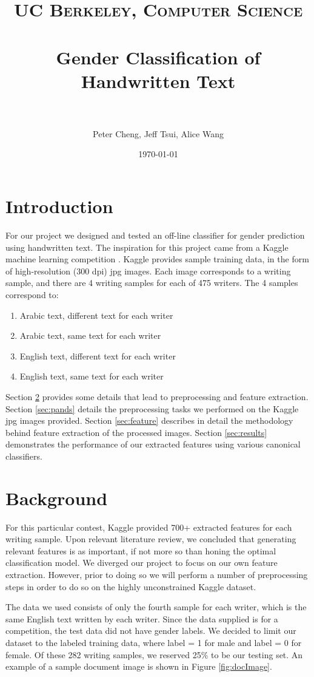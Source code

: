 \documentclass[paper=a4, fontsize=11pt]{scrartcl} %
\title{	
\normalfont \normalsize 
\textsc{UC Berkeley, Computer Science} \\ [25pt] %
\horrule{0.5pt} \\[0.4cm] %
\huge Gender Classification of Handwritten Text \\ %
\horrule{2pt} \\[0.5cm] %
}
\author{Peter Cheng, Jeff Tsui, Alice Wang} %
\date{\normalsize\today} %
\numberwithin{equation}{section} %
\numberwithin{figure}{section} %
\numberwithin{table}{section} %
\begin{document}
\maketitle %

\section{Introduction}
For our project we designed and tested an off-line classifier for gender prediction using handwritten text. The inspiration for this project came from a Kaggle machine learning competition \cite{kaggle}. Kaggle provides sample training data, in the form of high-resolution (300 dpi) jpg images. Each image corresponds to a writing sample, and there are 4 writing samples for each of 475 writers. The 4 samples correspond to:	

\begin{enumerate}
\item Arabic text, different text for each writer
\item Arabic text, same text for each writer
\item English text, different text for each writer
\item English text, same text for each writer
\end{enumerate}

Section \ref{sec:background} provides some details that lead to
preprocessing and feature extraction. Section \ref{sec:pands} details
the preprocessing tasks we performed on the Kaggle jpg images
provided. Section \ref{sec:feature} describes in detail the
methodology behind feature extraction of the processed images. Section
\ref{sec:results} demonstrates the performance of our extracted features
using various canonical classifiers.

\section{Background}
\label{sec:background}
For this particular contest, Kaggle provided 700+ extracted features for each writing sample. Upon relevant literature review, we concluded that generating relevant features is as important, if not more so than honing the optimal classification model. We diverged our project to focus on our own feature extraction. However, prior to doing so we will perform a number of preprocessing steps in order to do so on the highly unconstrained Kaggle dataset.

The data we used consists of only the fourth sample for each writer,
which is the same English text written by each writer. Since the data
supplied is for a competition, the test data did not have gender
labels. We decided to limit our dataset to the labeled training data,
where label = 1 for male and label = 0 for female. Of these 282
writing samples, we reserved
25\% to be our testing set. An example of a sample document image is shown in Figure \ref{fig:docImage}.
\end{document}

